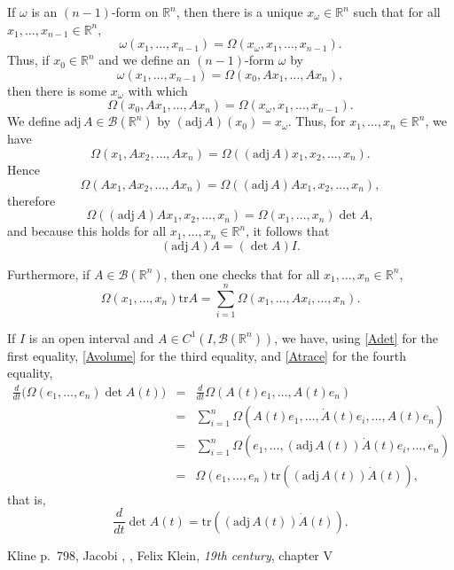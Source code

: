 \documentclass{article}
\newcommand{\tr}{\textrm{tr}}
\newcommand{\adj}{\mathrm{adj}\,}
\begin{document}
If $\omega$ is an $(n-1)$-form on $\mathbb{R}^n$, then there is a unique $x_\omega \in \mathbb{R}^n$ such that for all
$x_1,\ldots,x_{n-1} \in \mathbb{R}^n$,
\[
\omega(x_1,\ldots,x_{n-1}) = \Omega(x_\omega,x_1,\ldots,x_{n-1}).
\]
Thus, if $x_0 \in \mathbb{R}^n$ and we define an $(n-1)$-form $\omega$ by
\[
\omega(x_1,\ldots,x_{n-1}) = \Omega(x_0,Ax_1,\ldots,Ax_n),
\]
then there is some $x_\omega$ with which
\[
\Omega(x_0,Ax_1,\ldots,Ax_n)=\Omega(x_\omega,x_1,\ldots,x_{n-1}).
\]
We define $\adj A \in \mathscr{B}(\mathbb{R}^n)$ by $(\adj A)(x_0)=x_\omega$.
Thus, for $x_1,\ldots,x_n \in \mathbb{R}^n$, we have
\begin{equation}
\Omega(x_1,Ax_2,\ldots,Ax_n)=\Omega((\adj A)x_1,x_2,\ldots,x_n).
\label{Avolume}
\end{equation}
Hence
\[
\Omega(Ax_1,Ax_2,\ldots,Ax_n) = \Omega((\adj A)Ax_1,x_2,\ldots,x_n),
\]
 therefore
\[
\Omega((\adj A)Ax_1,x_2,\ldots,x_n) = \Omega(x_1,\ldots,x_n) \det A,
\]
and because this holds for all $x_1,\ldots,x_n \in \mathbb{R}^n$, it follows that
\[
(\adj A) A = (\det A)I.
\]

Furthermore, if $A \in \mathscr{B}(\mathbb{R}^n)$, then one checks that for all $x_1,\ldots,x_n \in \mathbb{R}^n$,
\begin{equation}
\Omega(x_1,\ldots,x_n) \tr A = \sum_{i=1}^n \Omega(x_1,\ldots,Ax_i,\ldots,x_n).
\label{Atrace}
\end{equation}

If $I$ is an open interval and $A \in C^1(I,\mathscr{B}(\mathbb{R}^n))$, we have, using \eqref{Adet} for the first equality,
 \eqref{Avolume} for the third equality, and \eqref{Atrace} for the fourth
equality,
\begin{eqnarray*}
\frac{d}{dt}\Big( \Omega(e_1,\ldots,e_n) \det A(t) \Big)&=&\frac{d}{dt}\Omega(A(t)e_1,\ldots,A(t)e_n)\\
&=&\sum_{i=1}^n \Omega(A(t)e_1,\ldots,\dot{A}(t)e_i,\ldots,A(t)e_n)\\
&=&\sum_{i=1}^n \Omega(e_1,\ldots,(\adj A(t))\dot{A}(t)e_i,\ldots,e_n)\\
&=&\Omega(e_1,\ldots,e_n) \tr( (\adj A(t)) \dot{A}(t)),
\end{eqnarray*}
that is,
\[
\frac{d}{dt} \det A(t) =  \tr( (\adj A(t)) \dot{A}(t)).
\]


Kline p.~798, Jacobi \cite{jacobi1841a}, \cite[\S 17]{jacobi1845}, Felix Klein, {\em 19th century}, chapter V
\end{document}
